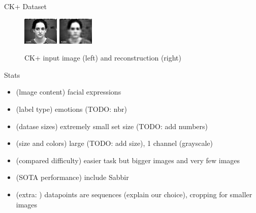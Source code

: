 \documentclass[final]{beamer}
\newlength{\onecolwid}
\begin{document}
\begin{frame}[t]
\begin{columns}[t]
\begin{column}{\onecolwid}
\begin{block}{CK+ Dataset}
\begin{figure}
\includegraphics[width=0.5\linewidth]{graphics/face.png}	
\includegraphics[width=0.5\linewidth]{graphics/reconst.png}
\caption{CK+ input image (left) and reconstruction (right)}
\end{figure}

\end{block}

\begin{block}{Stats}
\begin{itemize}
\item (lmage content) facial expressions
\item (label type) emotions (TODO: nbr)
\item (datase sizes) extremely small set size (TODO: add numbers)
\item (size and colors) large (TODO: add size), 1 channel (grayscale) 
\item (compared difficulty) easier task but bigger images and very few images
\item (SOTA performance) include Sabbir
\item (extra: ) datapoints are sequences (explain our choice), cropping for smaller images

\end{itemize}
\end{block}


\end{column}
\end{columns}
\end{frame}
\end{document}
